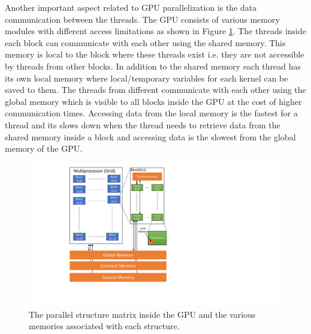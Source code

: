 \documentclass[preprint,10pt,authoryear,review]{elsarticle}
\begin{document}
Another important aspect related to GPU parallelization is the data communication between the threads. 
The GPU consists of various memory modules with different access limitations as shown in Figure 
\ref{fig:bkg_gpu_arch}. The threads inside each block can communicate with each other using the 
shared memory. This memory is local to the block where these threads exist i.e. they are not 
accessible by threads from other blocks. In addition to the shared memory each thread has its 
own local memory where local/temporary variables for each kernel can be saved to them. 
The threads from different communicate with each other using the global memory which 
is visible to all blocks inside the GPU at the cost of higher communication times. 
Accessing data from the local memory is the fastest for a thread and its slows down when
the thread needs to retrieve data from the shared memory inside a block and accessing data 
is the slowest from the global memory of the GPU. 


\begin{figure}[h]
\centering
\includegraphics[scale=0.75]{gpu_arch_new.pdf}
\caption{The parallel structure matrix inside the GPU and the various memories associated 
with each structure.}
\label{fig:bkg_gpu_arch}
\end{figure}
\end{document}
